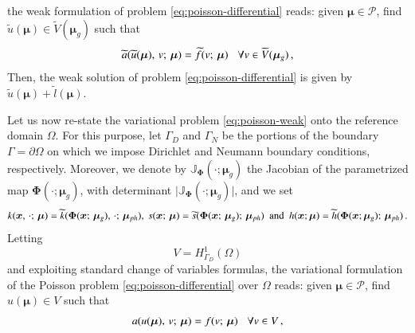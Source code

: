 \documentclass[longtitle]{elsarticle}
\numberwithin{equation}{section}
\theoremstyle{theorem}
\theoremstyle{definition}
\theoremstyle{remark}
\theoremstyle{proposition}
\numberwithin{figure}{section}
\newcommand{\wt}[1]{\widetilde{#1}}
\newcommand{\bg}[1]{\boldsymbol{#1}}
\begin{document}
		the weak formulation of problem \eqref{eq:poisson-differential} reads: given $\bg{\mu} \in \mathcal{P}$, find $\wt{u}(\bg{\mu}) \in \wt{V}(\bg{\mu}_g)$ such that
		\begin{equation}
			\label{eq:poisson-weak}
			\wt{a}(\wt{u}(\bg{\mu}), \, v; \, \bg{\mu}) = \wt{f}(v; \, \bg{\mu}) \hspace*{0.3cm} \forall v \in \wt{V}(\bg{\mu}_g) \, , 
		\end{equation}
		Then, the weak solution of problem \eqref{eq:poisson-differential} is given by $\wt{u}(\bg{\mu}) + \wt{l}(\bg{\mu})$. 

		Let us now re-state the variational problem \eqref{eq:poisson-weak} onto the reference domain $\Omega$. For this purpose, let $\Gamma_D$ and $\Gamma_N$ be the portions of the boundary $\Gamma = \partial \Omega$ on which we impose Dirichlet and Neumann boundary conditions, respectively. Moreover, we denote by $\mathbb{J}_{\bg{\Phi}}(\cdot; \bg{\mu}_g)$ the Jacobian of the parametrized map $\bg{\Phi}(\cdot; \bg{\mu}_g)$, with determinant $\lvert \mathbb{J}_{\bg{\Phi}}(\cdot; \bg{\mu}_g) \rvert$, and we set 
		\vspace*{-0.2cm}	
		\begin{equation*}
			k(\bg{x}, \, \cdot; \, \bg{\mu}) = \wt{k}(\bg{\Phi}(\bg{x}; \, \bg{\mu}_g), \, \cdot; \, \bg{\mu}_{ph}), ~ s(\bg{x}; \, \bg{\mu}) = \wt{s}(\bg{\Phi}(\bg{x}; \, \bg{\mu}_g); \, \bg{\mu}_{ph}) ~~ \text{and} ~~ h(\bg{x}; \bg{\mu}) = \wt{h}(\bg{\Phi}(\bg{x}; \bg{\mu}_g); \, \bg{\mu}_{ph}) \, . 
			\vspace*{-0.2cm}
		\end{equation*}
		Letting \[ V = H^1_{\Gamma_D}(\Omega) \] and exploiting standard change of variables formulas, the variational formulation of the Poisson problem \eqref{eq:poisson-differential} over $\Omega$ reads: given $\bg{\mu} \in \mathcal{P}$, find $u(\bg{\mu}) \in V$ such that
		\begin{equation*}
			a(u(\bg{\mu}), \, v; \, \bg{\mu}) = f(v; \, \bg{\mu}) \hspace*{0.3cm} \forall v \in V \, ,
		\end{equation*}
\end{document}
